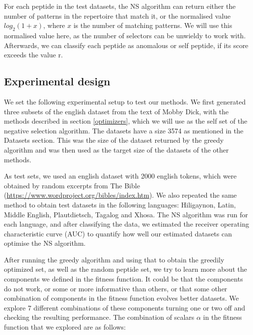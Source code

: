 \documentclass{article}
\begin{document}
For each peptide in the test datasets, the NS algorithm can return either the number of patterns in the repertoire that 
match it, or the normalised value $log_2(1 + x)$, where $x$ is the number of matching patterns. We will use this 
normalised value here, as the number of selectors can be unwieldy to work with. Afterwards, we can classify each peptide 
as anomalous or self peptide, if its score exceeds the value r.

\subsection{Experimental design}
We set the following experimental setup to test our methods. We first generated three subsets of the english dataset 
from the text of Mobby Dick, with the methods described in section \ref{optimizers}, which we will use as the self set of 
the negative selection algorithm. The datasets have a size 3574 as mentioned in the Datasets section. This was the size of the dataset returned by the greedy 
algorithm and was then used as the target size of the datasets of the other methods.

As test sets, we used an english dataset with 2000 english tokens, which were obtained by random excerpts from The Bible (\url{https://www.wordproject.org/bibles/index.htm}).
We also repeated the same method to obtain test datasets in the following languages: Hiligaynon, Latin, Middle English, 
Plautdietsch, Tagalog and Xhosa. The NS algorithm was run for each language, and after classifying the data, we 
estimated the receiver operating characteristic curve (AUC) to quantify how well our estimated datasets can optimise 
the NS algorithm.

After running the greedy algorithm and using that to obtain the greedily optimized set, as well as the random peptide set,
we try to learn more about the components we defined in the fitness function. 
It could be that the components do not work, or some or more informative than others, or that some other combination of components in the fitness function evolves better datasets.
We explore 7 different combinations of these components turning one or two off and checking the resulting performance.
The combination of scalars $\alpha$ in the fitness function that we explored are as follows:
\end{document}
